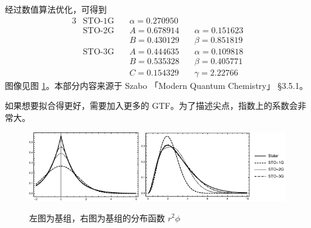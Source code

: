 {经过数值算法优化，可得到
\begin{alignat}{3}
    &\text{STO-1G}\quad&\alpha = \num{0.270950} \quad&{}\\
    &\text{STO-2G}\quad&A = \num{0.678914} \quad &\alpha = \num{0.151623} \\
    & &B = \num{0.430129}\quad &\beta = \num{0.851819} \\
    &\text{STO-3G}\quad &A = \num{0.444635} \quad&\alpha = \num{0.109818} \\
    &&B = \num{0.535328}\quad&\beta = \num{0.405771}\\
    &&C = \num{0.154329}\quad&\gamma = \num{2.22766}
\end{alignat}
图像见图 \ref{fig:STO_GTO}。本部分内容来源于 Szabo 「Modern Quantum Chemistry」 \S 3.5.1。

如果想要拟合得更好，需要加入更多的 GTF。为了描述尖点，指数上的系数会非常大。
}
\begin{figure}[tbp]
    \includegraphics[height=3cm]{fig/STO_vs_GTO.pdf}
    \includegraphics[height=3cm]{fig/STO_RDF.pdf}
    \caption{左图为基组，右图为基组的分布函数 $r^2\phi$}
    \label{fig:STO_GTO}
\end{figure}

